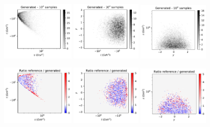 \documentclass[twocolumn,preprintnumbers,superscriptaddress]{revtex4-2}
\begin{document}
\begin{figure}

  \includegraphics[width=0.32\textwidth]{plots/hardware/ibm_santiago/s-t_FAKE_IBM_10k.pdf}%
  \includegraphics[width=0.305\textwidth]{plots/hardware/ibm_santiago/t-y_FAKE_IBM_10k.pdf}%
  \includegraphics[width=0.31\textwidth]{plots/hardware/ibm_santiago/y-s_FAKE_IBM_10k.pdf}

  \includegraphics[width=0.32\textwidth]{plots/hardware/ibm_santiago/s-t_RATIO_IBM_10k.pdf}%
  \includegraphics[width=0.305\textwidth]{plots/hardware/ibm_santiago/t-y_RATIO_IBM_10k.pdf}%
  \includegraphics[width=0.31\textwidth]{plots/hardware/ibm_santiago/y-s_RATIO_IBM_10k.pdf}
  

\end{figure}
\end{document}

